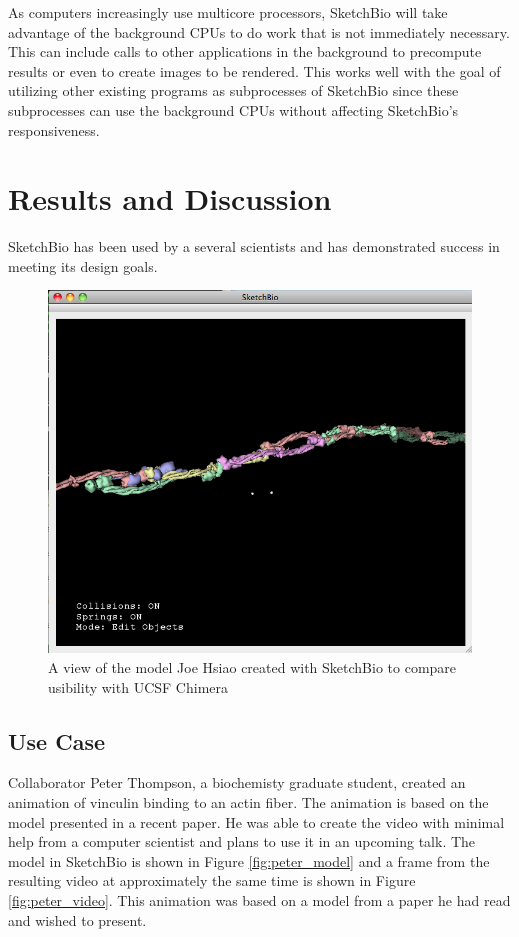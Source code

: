 \documentclass[twocolumn]{bmcart}%
\begin{document}
As computers increasingly use multicore processors, SketchBio will take advantage of the background CPUs to do work that is not immediately necessary.  This can include calls to other applications in the background to precompute results or even to create images to be rendered.  This works well with the goal of utilizing other existing programs as subprocesses of SketchBio since these subprocesses can use the background CPUs without affecting SketchBio's responsiveness.

\section*{Results and Discussion}
SketchBio has been used by a several scientists and has demonstrated success in meeting its design goals.

\begin{figure}[h]
\centering
\includegraphics[width=0.9\columnwidth]{joe_test.png}
\caption{A view of the model Joe Hsiao created with SketchBio to compare usibility with UCSF Chimera}
\label{fig:joe_test}
\end{figure}

\subsection*{Use Case}
Collaborator Peter Thompson, a biochemisty graduate student, created an animation of vinculin binding to an actin fiber.  The animation is based on the model presented in a recent paper.  He was able to create the video with minimal help from a computer scientist and plans to use it in an upcoming talk.  The model in SketchBio is shown in Figure \ref{fig:peter_model} and a frame from the resulting video at approximately the same time is shown in Figure \ref{fig:peter_video}.   This animation was based on a model from a paper he had read and wished to present.
\end{document}
